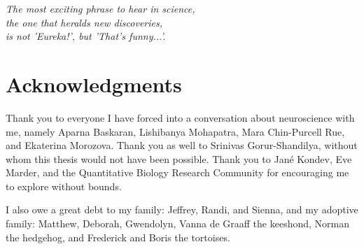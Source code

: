 
\begin{flushright}{\slshape
    The most exciting phrase to hear in science, \\
    the one that heralds new discoveries, \\ 
    is not 'Eureka!', but 'That's funny...'.} \\ \medskip
\end{flushright}



\bigskip

\begingroup
\let\clearpage\relax
\let\cleardoublepage\relax
\let\cleardoublepage\relax
\chapter*{Acknowledgments}
Thank you to everyone I have forced into a conversation about neuroscience with me, namely Aparna Baskaran, Lishibanya Mohapatra, Mara Chin-Purcell Rue, and Ekaterina Morozova. Thank you as well to Srinivas Gorur-Shandilya, without whom this thesis would not have been possible. Thank you to Jan\'e Kondev, Eve Marder, and the Quantitative Biology Research Community for encouraging me to explore without bounds.

I also owe a great debt to my family: Jeffrey, Randi, and Sienna, and my adoptive family: Matthew, Deborah, Gwendolyn, Vanna de Graaff the keeshond, Norman the hedgehog, and Frederick and Boris the tortoises.

\endgroup



